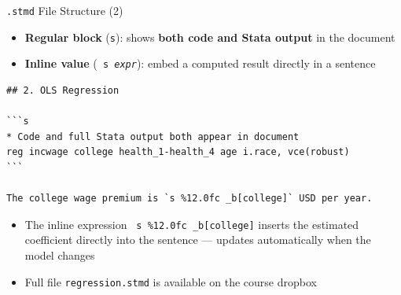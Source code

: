 \documentclass[dvipsnames,hyperref={pdfpagelabels=false}]{beamer}
\begin{document}
\begin{frame}[fragile]{\texttt{.stmd} File Structure (2)}

	\begin{itemize}
		\item \textbf{Regular block} (\texttt{{\char96}{}{}s}): shows \textbf{both code and Stata output} in the document
		\vspace{0.2cm}
		\item \textbf{Inline value} (\texttt{{} s \textit{expr}{}}): embed a computed result directly in a sentence
	\end{itemize}

\begin{lstlisting}[language={},basicstyle=\ttfamily\fontsize{7.5}{9}\selectfont,keywordstyle={},breaklines=true,breakatwhitespace=true]
## 2. OLS Regression

```s
* Code and full Stata output both appear in document
reg incwage college health_1-health_4 age i.race, vce(robust)
```

The college wage premium is `s %12.0fc _b[college]` USD per year.
\end{lstlisting}

	\begin{itemize}
		\item The inline expression \texttt{{} s \%12.0fc \_b[college]{}} inserts the estimated coefficient directly into the sentence --- updates automatically when the model changes
		\vspace{0.1cm}
		\item Full file \texttt{regression.stmd} is available on the course dropbox
	\end{itemize}

\end{frame}
\end{document}
